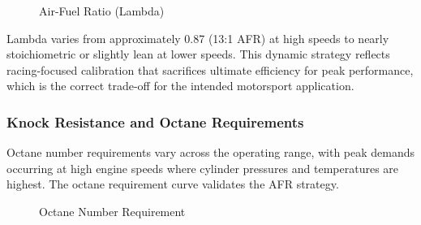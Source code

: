 \begin{figure}[H]
    \centering
    \begin{minipage}{\textwidth}
        \centering
        \caption{Air-Fuel Ratio (Lambda)}
        \label{fig:task2_lambda_detail}
    \end{minipage}
\end{figure}

Lambda varies from approximately 0.87 (13:1 AFR) at high speeds to nearly stoichiometric or slightly lean at lower speeds. This dynamic strategy reflects racing-focused calibration that sacrifices ultimate efficiency for peak performance, which is the correct trade-off for the intended motorsport application.

\subsubsection{Knock Resistance and Octane Requirements}

Octane number requirements vary across the operating range, with peak demands occurring at high engine speeds where cylinder pressures and temperatures are highest. The octane requirement curve validates the AFR strategy.

\begin{figure}[H]
    \centering
    \begin{minipage}{\textwidth}
        \centering
        \caption{Octane Number Requirement}
        \label{fig:task2_octane_detail}
    \end{minipage}
\end{figure}

